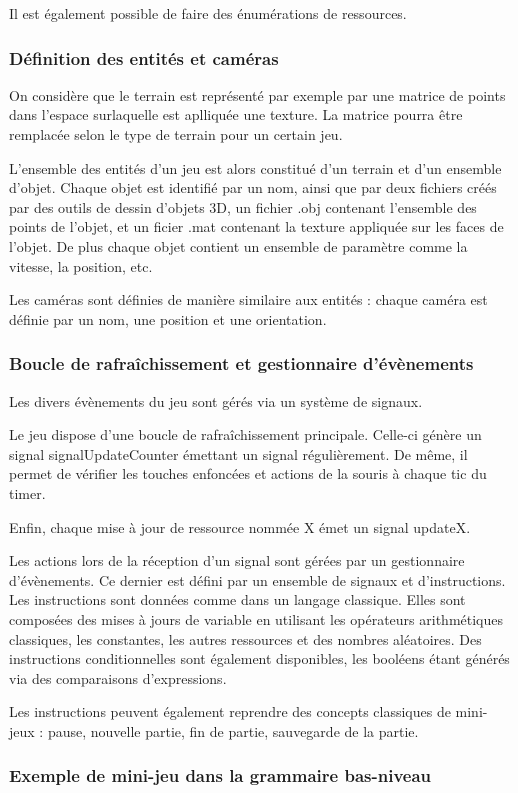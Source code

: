 Il est également possible de faire des énumérations de ressources.

\subsubsection{Définition des entités et caméras}

On considère que le terrain est représenté par exemple par une matrice de points dans l'espace surlaquelle est aplliquée une texture.
La matrice pourra être remplacée selon le type de terrain pour un certain jeu. 

L'ensemble des entités d'un jeu est alors constitué d'un terrain et d'un ensemble d'objet.
Chaque objet est identifié par un nom, ainsi que par deux fichiers créés par des outils de dessin d'objets 3D, un fichier .obj contenant l'ensemble
des points de l'objet, et un ficier .mat contenant la texture appliquée sur les faces de l'objet.
De plus chaque objet contient un ensemble de paramètre comme la vitesse, la position, etc. 

Les caméras sont définies de manière similaire aux entités : chaque caméra est définie par un nom, une position et une orientation.


\subsubsection{Boucle de rafraîchissement et gestionnaire d'évènements}

Les divers évènements du jeu sont gérés via un système de signaux.

Le jeu dispose d'une boucle de rafraîchissement principale. Celle-ci génère un signal
signalUpdateCounter émettant un signal régulièrement.
De même, il permet de vérifier les touches enfoncées et actions de la souris à chaque tic du timer.

Enfin, chaque mise à jour de ressource nommée X émet un signal updateX.

Les actions lors de la réception d'un signal sont gérées par un gestionnaire d'évènements.
Ce dernier est défini par un ensemble de signaux et d'instructions.
Les instructions sont données comme dans un langage classique.
Elles sont composées des mises à jours de variable en utilisant les opérateurs arithmétiques classiques, les constantes, les autres ressources et des nombres
aléatoires.
Des instructions conditionnelles sont également disponibles, les booléens étant générés via des comparaisons d'expressions.

Les instructions peuvent également reprendre des concepts classiques de mini-jeux : pause, nouvelle partie, fin de partie, sauvegarde de la partie.

\subsubsection{Exemple de mini-jeu dans la grammaire bas-niveau}

